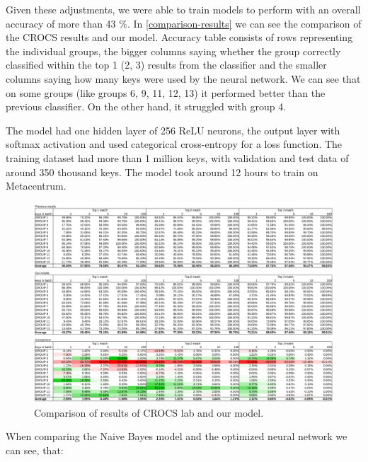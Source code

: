Given these adjustments, we were able to train models to perform with an overall accuracy of more than 43 \%. In \autoref{comparison-results} we can see the comparison of the CROCS results and our model. Accuracy table consists of rows representing the individual groups, the bigger columns saying whether the group correctly classified within the top 1 (2, 3) results from the classifier and the smaller columns saying how many keys were used by the neural network. We can see that on some groups (like groups 6, 9, 11, 12, 13) it performed better than the previous classifier. On the other hand, it struggled with group 4.

The model had one hidden layer of 256 ReLU neurons, the output layer with softmax activation and used categorical cross-entropy for a loss function. The training dataset had more than 1 million keys, with validation and test data of around 350 thousand keys. The model took around 12 hours to train on Metacentrum.

\begin{figure}

\centering
\includegraphics[width=\textwidth]{tex/images/results/comparison_13}
\caption{Comparison of results of CROCS lab and our model.}
\label{comparison-results}

\end{figure}

\noindent
When comparing the Naive Bayes model and the optimized neural network we can see, that:

